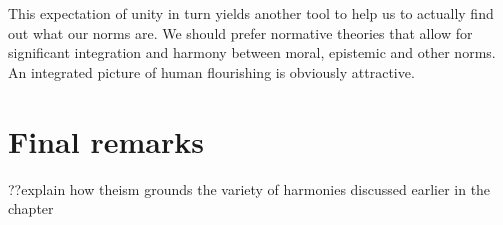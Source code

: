 This expectation of unity in turn yields another tool to help us to actually find out what our norms are. We should prefer normative theories
that allow for significant integration and harmony between moral, epistemic and other norms. An integrated picture of human flourishing
is obviously attractive.

\section{Final remarks}
??explain how theism grounds the variety of harmonies discussed earlier in the chapter

\chaptertail

